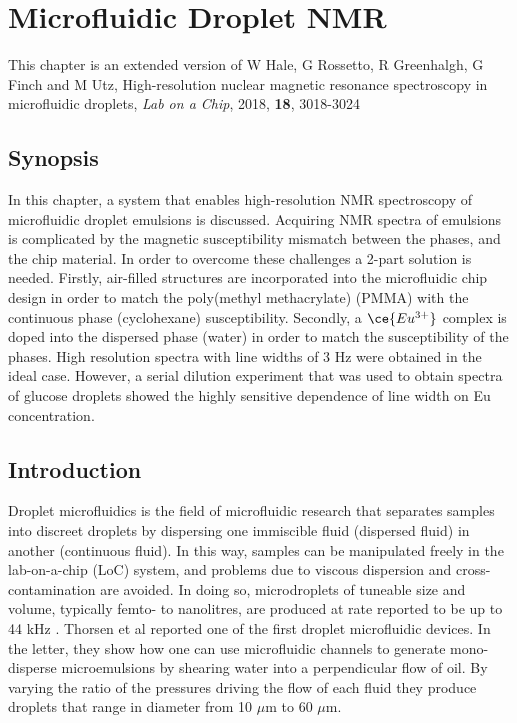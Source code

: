 
\chapter{Microfluidic Droplet NMR}\label{Chapter:Droplets}

This chapter is an extended version of W Hale, G Rossetto, R Greenhalgh, G Finch and M Utz, High-resolution
nuclear magnetic resonance spectroscopy in microfluidic droplets, \textit{Lab on a Chip}, 2018, \textbf{18}, 3018-3024 \citep{Hale:2018fv}

\section{Synopsis}

In this chapter, a system that enables high-resolution NMR spectroscopy of microfluidic droplet
emulsions is discussed. Acquiring NMR spectra of emulsions is complicated by the magnetic
susceptibility mismatch between the phases, and the chip material. In order to overcome these challenges a
2-part solution is needed. Firstly, air-filled structures are incorporated into the microfluidic chip design in order
to match the poly(methyl methacrylate) (PMMA) with the continuous phase (cyclohexane) susceptibility. Secondly, a $\ce{Eu^{3+}}$
complex is doped into the dispersed phase (water) in order to match the susceptibility of
the phases. High resolution spectra with line widths of 3 Hz were obtained in the ideal case.
However, a serial dilution experiment that was used to obtain spectra of glucose droplets showed
the highly sensitive dependence of line width on Eu concentration.

\section{Introduction}

Droplet microfluidics is the field of microfluidic research that separates samples into discreet droplets by dispersing one
immiscible fluid (dispersed fluid) in another (continuous fluid). In this way, samples can be manipulated freely in the lab-on-a-chip (LoC) system,
and problems due to viscous dispersion and cross-contamination
are avoided. In doing so, microdroplets of tuneable size and volume,
typically femto- to nanolitres, are produced at rate reported to be up to 44 kHz \citep{RN115}. Thorsen et al \citep{RN104}
reported one of the first droplet microfluidic devices. In the letter, they show how one can use microfluidic channels to
generate mono-disperse microemulsions by shearing water into a perpendicular flow of oil. By varying the ratio of the pressures
driving the flow of each fluid they produce droplets that range in diameter from 10 $\mu\text{m}$ to 60 $\mu\text{m}$.

